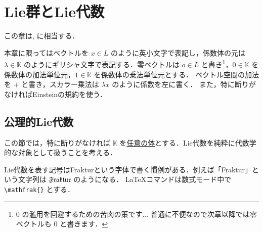 \documentclass[rep_main]{subfiles}
\begin{document}
\chapter{Lie群とLie代数}

この章は\cite[Chapter I]{Humphreys1972introduction}, \cite[第1-3章]{Satake1987LieAlg}に相当する．

本章に限ってはベクトルを $x \in L$ のように英小文字で表記し，係数体の元は $\lambda \in \mathbb{K}$ のようにギリシャ文字で表記する．零ベクトルは $o \in L$ と書き\footnote{$0$ の濫用を回避するための苦肉の策です... 普通に不便なので次章以降では零ベクトルも $0$ と書きます．}，$0 \in \mathbb{K}$ を係数体の加法単位元，$1 \in \mathbb{K}$ を係数体の乗法単位元とする．
ベクトル空間の加法を $+$ と書き，スカラー乗法は $\lambda x$ のように係数を左に書く．
また，特に断りがなければEinsteinの規約を使う．

\section{公理的Lie代数}

この節では，特に断りがなければ $\mathbb{K}$ を\underline{任意の体}とする．Lie代数を純粋に代数学的な対象として扱うことを考える．

\begin{marker}
    Lie代数を表す記号はFrakturという字体で書く慣例がある．例えば「Fraktur」という文字列は $\mathfrak{Fraktur}$ のようになる．
    \LaTeX コマンドは数式モード中で \texttt{\textbackslash mathfrak\{\}} とする．
\end{marker}
\end{document}
